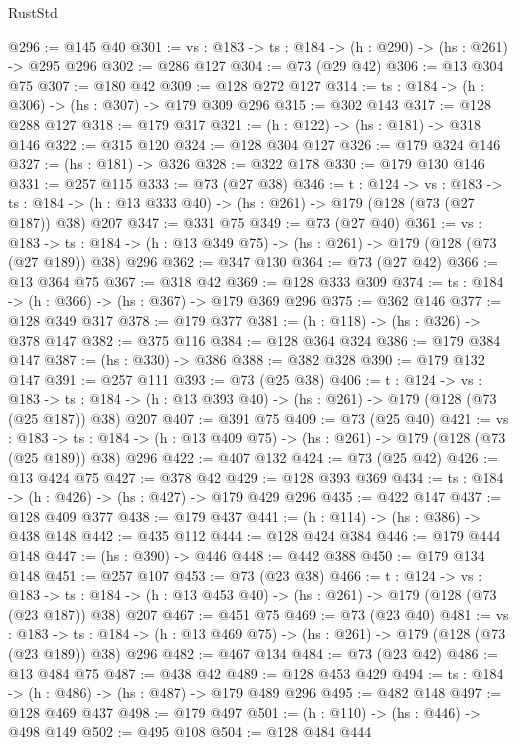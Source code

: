 \begin{lexlean}{RustStd}
\begin{coremodule}
{\begin{coremodule}
{{{{@296 := @145 @40
@301 := {vs : @183} -> {ts : @184} -> (h : @290) -> (hs : @261) -> @295 @296
@302 := @286 @127
@304 := @73 (@29 @42)
@306 := @13 @304 @75
@307 := @180 @42
@309 := @128 @272 @127
@314 := {ts : @184} -> (h : @306) -> (hs : @307) -> @179 @309 @296
@315 := @302 @143
@317 := @128 @288 @127
@318 := @179 @317
@321 := (h : @122) -> (hs : @181) -> @318 @146
@322 := @315 @120
@324 := @128 @304 @127
@326 := @179 @324 @146
@327 := (hs : @181) -> @326
@328 := @322 @178
@330 := @179 @130 @146
@331 := @257 @115
@333 := @73 (@27 @38)
@346 := {t : @124} ->
  {vs : @183} ->
  {ts : @184} -> (h : @13 @333 @40) -> (hs : @261) -> @179 (@128 (@73 (@27 @187)) @38) @207
@347 := @331 @75
@349 := @73 (@27 @40)
@361 := {vs : @183} ->
  {ts : @184} -> (h : @13 @349 @75) -> (hs : @261) -> @179 (@128 (@73 (@27 @189)) @38) @296
@362 := @347 @130
@364 := @73 (@27 @42)
@366 := @13 @364 @75
@367 := @318 @42
@369 := @128 @333 @309
@374 := {ts : @184} -> (h : @366) -> (hs : @367) -> @179 @369 @296
@375 := @362 @146
@377 := @128 @349 @317
@378 := @179 @377
@381 := (h : @118) -> (hs : @326) -> @378 @147
@382 := @375 @116
@384 := @128 @364 @324
@386 := @179 @384 @147
@387 := (hs : @330) -> @386
@388 := @382 @328
@390 := @179 @132 @147
@391 := @257 @111
@393 := @73 (@25 @38)
@406 := {t : @124} ->
  {vs : @183} ->
  {ts : @184} -> (h : @13 @393 @40) -> (hs : @261) -> @179 (@128 (@73 (@25 @187)) @38) @207
@407 := @391 @75
@409 := @73 (@25 @40)
@421 := {vs : @183} ->
  {ts : @184} -> (h : @13 @409 @75) -> (hs : @261) -> @179 (@128 (@73 (@25 @189)) @38) @296
@422 := @407 @132
@424 := @73 (@25 @42)
@426 := @13 @424 @75
@427 := @378 @42
@429 := @128 @393 @369
@434 := {ts : @184} -> (h : @426) -> (hs : @427) -> @179 @429 @296
@435 := @422 @147
@437 := @128 @409 @377
@438 := @179 @437
@441 := (h : @114) -> (hs : @386) -> @438 @148
@442 := @435 @112
@444 := @128 @424 @384
@446 := @179 @444 @148
@447 := (hs : @390) -> @446
@448 := @442 @388
@450 := @179 @134 @148
@451 := @257 @107
@453 := @73 (@23 @38)
@466 := {t : @124} ->
  {vs : @183} ->
  {ts : @184} -> (h : @13 @453 @40) -> (hs : @261) -> @179 (@128 (@73 (@23 @187)) @38) @207
@467 := @451 @75
@469 := @73 (@23 @40)
@481 := {vs : @183} ->
  {ts : @184} -> (h : @13 @469 @75) -> (hs : @261) -> @179 (@128 (@73 (@23 @189)) @38) @296
@482 := @467 @134
@484 := @73 (@23 @42)
@486 := @13 @484 @75
@487 := @438 @42
@489 := @128 @453 @429
@494 := {ts : @184} -> (h : @486) -> (hs : @487) -> @179 @489 @296
@495 := @482 @148
@497 := @128 @469 @437
@498 := @179 @497
@501 := (h : @110) -> (hs : @446) -> @498 @149
@502 := @495 @108
@504 := @128 @484 @444
}}}}
\end{coremodule}}
\end{coremodule}
\end{lexlean}
